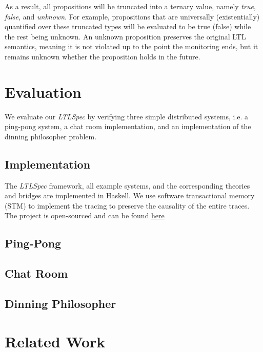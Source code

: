 \documentclass[format=acmsmall, nonacm=true, review=true, screen=true]{acmart}
\newcommand{\ltlspec}{\textit{LTLSpec}\xspace}
\begin{document}
As a result, all propositions will be truncated into a ternary value, namely \textit{true}, \textit{false}, and \textit{unknown}.
For example, propositions that are universally (existentially) quantified over these truncated types will be evaluated to be true (false) while the rest being unknown.
An unknown proposition preserves the original LTL semantics, meaning it is not violated up to the point the monitoring ends, but it remains unknown whether the proposition holds in the future.

\section{Evaluation}

We evaluate our \ltlspec by verifying three simple distributed systems, i.e. a ping-pong system, a chat room implementation, and an implementation of the dinning philosopher problem.

\subsection{Implementation}

The \ltlspec framework, all example systems, and the corresponding theories and bridges are implemented in Haskell.
We use software transactional memory (STM) to implement the tracing to preserve the causality of the entire traces.
The project is open-sourced and can be found \href{https://github.com/ejconlon/ltlspec}{here}

\subsection{Ping-Pong}

\subsection{Chat Room}

\subsection{Dinning Philosopher}

\section{Related Work}
\end{document}
